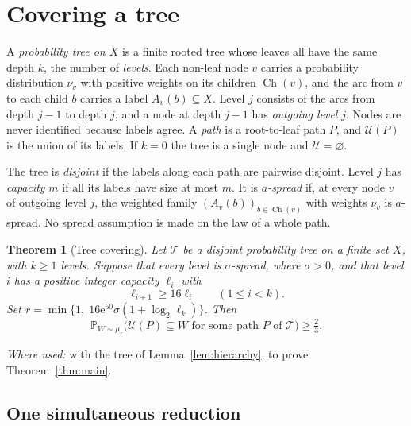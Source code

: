 \documentclass[11pt]{article}
\newtheorem{theorem}{Theorem}[section]
\numberwithin{equation}{section}
\newcommand{\PP}{\mathbb P}
\newcommand{\TT}{\mathcal T}
\newcommand{\UU}{\mathcal U}
\newcommand{\ch}{\operatorname{Ch}}
\newcommand{\ee}{\mathrm e}
\begin{document}
\section{Covering a tree}\label{sec:trees}

A \emph{probability tree on $X$} is a finite rooted tree whose leaves all have
the same depth $k$, the number of \emph{levels}. Each non-leaf node $v$ carries
a probability distribution $\nu_v$ with positive weights on its children
$\ch(v)$, and the arc from $v$ to each child $b$ carries a label
$A_v(b)\subseteq X$. Level $j$ consists of the arcs from depth $j-1$ to depth
$j$, and a node at depth $j-1$ has \emph{outgoing level} $j$. Nodes are never
identified because labels agree. A \emph{path} is a root-to-leaf path $P$, and
$\UU(P)$ is the union of its labels. If $k=0$ the tree is a single node and
$\UU=\varnothing$.

The tree is \emph{disjoint} if the labels along each path are pairwise disjoint.
Level $j$ has \emph{capacity} $m$ if all its labels have size at most $m$. It is
\emph{$a$-spread} if, at every node $v$ of outgoing level $j$, the weighted
family $(A_v(b))_{b\in\ch(v)}$ with weights $\nu_v$ is $a$-spread. No spread
assumption is made on the law of a whole path.

\begin{theorem}[Tree covering]\label{thm:tree}
Let $\TT$ be a disjoint probability tree on a finite set $X$,
with $k\ge1$ levels. Suppose that every level is $\sigma$-spread,
where $\sigma>0$, and that level $i$ has a positive integer capacity $\ell_i$
with
\[
 \ell_{i+1}\ge16\ell_i\qquad(1\le i<k).
\]
Set $r=\min\{1,\;16\ee^{50}\sigma(1+\log_2\ell_k)\}$. Then
\[
 \PP_{W\sim\mu_r}
 \bigl(\UU(P)\subseteq W\text{ for some path }P\text{ of }\TT\bigr)
 \ge\tfrac23.
\]
\end{theorem}

\emph{Where used:} with the tree of Lemma~\ref{lem:hierarchy}, to prove
Theorem~\ref{thm:main}.

\subsection{One simultaneous reduction}
\end{document}
